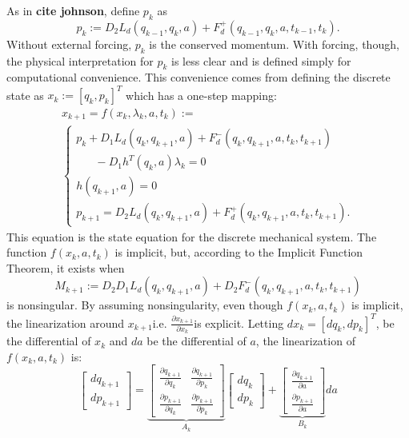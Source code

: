 \documentclass[letterpaper, 10pt, conference]{ieeeconf}
\begin{document}
As in \textbf{cite johnson}, define $p_k$ as 
\begin{equation}
p_k := D_2 L_d(q_{k-1},q_{k},a) + F_d^+(q_{k-1},q_{k},a,t_{k-1},t_{k}).
\label{eq-pk}
\end{equation}
Without external forcing, $p_k$ is the conserved momentum.  With forcing, though, the physical interpretation for $p_k$ is less clear and is defined simply for computational convenience.  This convenience comes from defining the discrete state as $x_k := [q_k,p_k]^T$ which has a one-step mapping:
\begin{equation}
\begin{array}{l}
x_{k+1} = f(x_k,\lambda_k,a,t_k):=\\\left\{\begin{array}{l}
p_k + D_1L_d(q_k,q_{k+1},a) + F_d^-(q_k,q_{k+1},a,t_k,t_{k+1}) \\\hspace{20pt} - D_1h^T(q_k,a)\lambda_k= 0 \\
h(q_{k+1},a) = 0\\
p_{k+1} = D_2 L_d(q_{k},q_{k+1},a) + F_d^+(q_{k},q_{k+1},a,t_{k},t_{k+1}).
\end{array}\right.
\end{array}
\label{eq-fk}
\end{equation}
This equation is the state equation for the discrete mechanical system.  The function $f(x_k,a,t_k)$ is implicit, but, according to the Implicit Function Theorem, it exists when
\[
M_{k+1}:=D_2D_1L_d(q_k,q_{k+1},a) + D_2F_d^-(q_k,q_{k+1},a,t_k,t_{k+1})
\]
is nonsingular.  By assuming nonsingularity, even though $f(x_k,a,t_k)$ is implicit, the linearization around $x_{k+1}$\textemdash i.e. $\frac{\partial x_{k+1}}{\partial x_k}$\textemdash is explicit.  Letting $dx_k = [dq_k,dp_k]^T$, be the differential of $x_k$ and $da$ be the differential of $a$, the linearization of $f(x_k,a,t_k)$ is:
\begin{equation}
\left[\begin{array}{cc}dq_{k+1} \\ dp_{k+1} \end{array}\right]
 = \underbrace{\left[\begin{array}{cc}
\frac{\partial q_{k+1}}{\partial q_k} & \frac{\partial q_{k+1}}{\partial p_k} \\
\frac{\partial p_{k+1}}{\partial q_k} & \frac{\partial p_{k+1}}{\partial p_k} 
\end{array}\right]}_{A_k}
\left[\begin{array}{cc}dq_{k} \\ dp_k \end{array}\right] + \underbrace{\left[\begin{array}{cc}\frac{\partial q_{k+1}}{\partial a} \\ \frac{\partial p_{k+1}}{\partial a} \end{array}\right]}_{B_k}da
\label{eq-lin_fk}
\end{equation}
\end{document}
